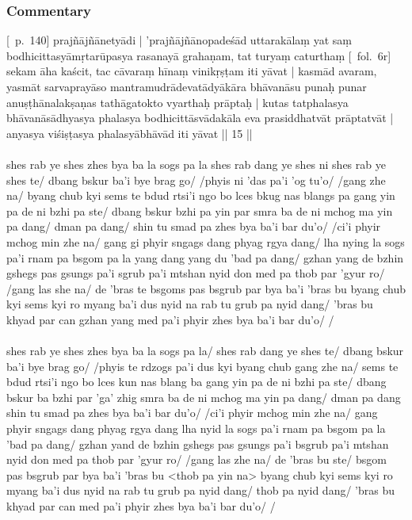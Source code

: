 \documentclass[12pt]{article}
\begin{document}
\subsubsection{Commentary}
[\EDD\ p.\ 140] prajñājñānetyādi | 'prajñājñānopadeśād uttarakālaṃ yat saṃ bodhicittasyāmṛtarūpasya rasanayā grahaṇam, tat turyaṃ caturthaṃ [\MS\ fol.\ 6r] sekam āha kaścit, tac cāvaraṃ hīnaṃ vinikṛṣṭam iti yāvat | kasmād avaram, yasmāt sarvaprayāso mantramudrādevatādyākāra bhāvanāsu punaḥ punar anuṣṭhānalakṣaṇas tathāgatokto vyarthaḥ prāptaḥ | kutas tatphalasya bhāvanāsādhyasya phalasya bodhicittāsvādakāla eva prasiddhatvāt prāptatvāt | anyasya viśiṣṭasya phalasyābhāvād iti yāvat || 15 ||\\

\textbf{\TVA}\\
shes rab ye shes zhes bya ba la sogs pa la shes rab dang ye shes ni shes rab ye shes te/ dbang bskur ba'i bye brag go/ /phyis ni 'das pa'i 'og tu'o/ /gang zhe na/ byang chub kyi sems te bdud rtsi'i ngo bo lces bkug nas blangs pa gang yin pa de ni bzhi pa ste/ dbang bskur bzhi pa yin par smra ba de ni mchog ma yin pa dang/ dman pa dang/ shin tu smad pa zhes bya ba'i bar du'o/ /ci'i phyir mchog min zhe na/ gang gi phyir sngags dang phyag rgya dang/ lha nying la sogs pa'i rnam pa bsgom pa la yang dang yang du 'bad pa dang/ gzhan yang de bzhin gshegs pas gsungs pa'i sgrub pa'i mtshan nyid don med pa thob par 'gyur ro/ /gang las she na/ de 'bras te bsgoms pas bsgrub par bya ba'i 'bras bu byang chub kyi sems kyi ro myang ba'i dus nyid na rab tu grub pa nyid dang/ 'bras bu khyad par can gzhan yang med pa'i phyir zhes bya ba'i bar du'o/ /\\

\textbf{\TVB}\\
shes rab ye shes zhes bya ba la sogs pa la/ shes rab dang ye shes te/ dbang bskur ba'i bye brag go/ /phyis te rdzogs pa'i dus kyi byang chub gang zhe na/ sems te bdud rtsi'i ngo bo lces kun nas blang ba gang yin pa de ni bzhi pa ste/ dbang bskur ba bzhi par 'ga' zhig smra ba de ni mchog ma yin pa dang/ dman pa dang shin tu smad pa zhes bya ba'i bar du'o/ /ci'i phyir mchog min zhe na/ gang phyir sngags dang phyag rgya dang lha nyid la sogs pa'i rnam pa bsgom pa la 'bad pa dang/ gzhan yand de bzhin gshegs pas gsungs pa'i bsgrub pa'i mtshan nyid don med pa thob par 'gyur ro/ /gang las zhe na/ de 'bras bu ste/ bsgom pas bsgrub par bya ba'i 'bras bu <thob pa yin na> byang chub kyi sems kyi ro myang ba'i dus nyid na rab tu grub pa nyid dang/ thob pa nyid dang/ 'bras bu khyad par can med pa'i phyir zhes bya ba'i bar du'o/ /
\end{document}
